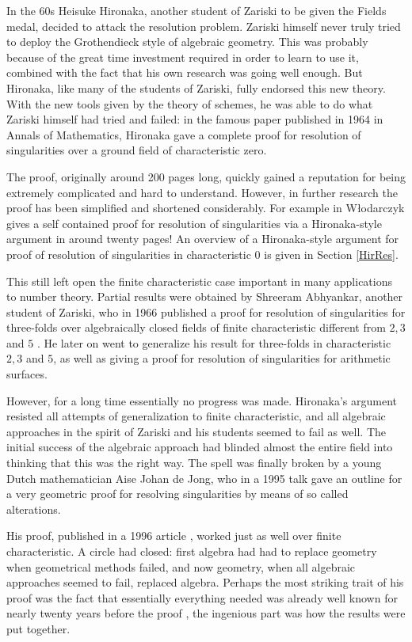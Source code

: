 \documentclass[12pt,a4paper,leqno]{article}
\newcommand{\fref}[1]{\hyperref[{#1}]{\ref*{#1}}}
\theoremstyle{plain}
\theoremstyle{definition}
\theoremstyle{remark}
\begin{document}
In the 60s Heisuke Hironaka, another student of Zariski to be given the Fields medal, decided to attack the resolution problem. Zariski himself never truly tried to deploy the Grothendieck style of algebraic geometry. This was probably because of the great time investment required in order to learn to use it, combined with the fact that his own research was going well enough. \cite{Par} But Hironaka, like many of the students of Zariski, fully endorsed this new theory. With the new tools given by the theory of schemes, he was able to do what Zariski himself had tried and failed: in the famous paper published in 1964 in Annals of Mathematics, Hironaka gave a complete proof for resolution of singularities over a ground field of characteristic zero. 

The proof, originally around 200 pages long, quickly gained a reputation for being extremely complicated and hard to understand. However, in further research the proof has been simplified and shortened considerably. For example in \cite{Wlo} W\l{}odarczyk gives a self contained proof for resolution of singularities via a Hironaka-style argument in around twenty pages! An overview of a Hironaka-style argument for proof of resolution of singularities in characteristic 0 is given in Section \fref{HirRes}.

This still left open the finite characteristic case important in many applications to number theory. Partial results were obtained by Shreeram Abhyankar, another student of Zariski, who in 1966 published a proof for resolution of singularities for three-folds over algebraically closed fields of finite characteristic different from $2,3$ and $5$ \cite{HLOQ}. He later on went to generalize his result for three-folds in characteristic $2,3$ and $5$, as well as giving a proof for resolution of singularities for arithmetic surfaces.

However, for a long time essentially no progress was made. Hironaka's argument resisted all attempts of generalization to finite characteristic, and all algebraic approaches in the spirit of Zariski and his students seemed to fail as well. The initial success of the algebraic approach had blinded almost the entire field into thinking that this was the right way. The spell was finally broken by a young Dutch mathematician Aise Johan de Jong, who in a 1995 talk gave an outline for a very geometric proof for resolving singularities by means of so called alterations. 

His proof, published in a 1996 article \cite{Jong}, worked just as well over finite characteristic. A circle had closed: first algebra had had to replace geometry when geometrical methods failed, and now geometry, when all algebraic approaches seemed to fail, replaced algebra. Perhaps the most striking trait of his proof was the fact that essentially everything needed was already well known for nearly twenty years before the proof \cite{HLOQ}, the ingenious part was how the results were put together.
\end{document}
